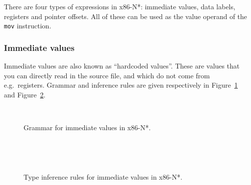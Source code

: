 There are four types of expressions in x86-N*: immediate values, data labels, registers and pointer offsets.
All of these can be used as the value operand of the \texttt{mov} instruction.

\subsubsection{Immediate values}\label{subsubsec:nstar-specific-x86amd64-exprs-immediate}

Immediate values are also known as ``hardcoded values''.
These are values that you can directly read in the source file, and which do not come from e.g.\ registers.
Grammar and inference rules are given respectively in Figure~\ref{fig:nstar-specific-x86amd64-exprs-immediate-grammar} and Figure~\ref{fig:nstar-specific-x86amd64-exprs-immediate-typerules}.

\begin{figure}[H]
  \centering
  \\
  \caption{Grammar for immediate values in x86-N*.}
  \label{fig:nstar-specific-x86amd64-exprs-immediate-grammar}
\end{figure}

\begin{figure}[H]
  \centering

  \begin{prooftree}
  \end{prooftree}
  \\\vspace{\baselineskip}
  \begin{prooftree}
  \end{prooftree}
  \\\vspace{\baselineskip}
  \begin{prooftree}
  \end{prooftree}

  \caption{Type inference rules for immediate values in x86-N*.}
  \label{fig:nstar-specific-x86amd64-exprs-immediate-typerules}
\end{figure}

